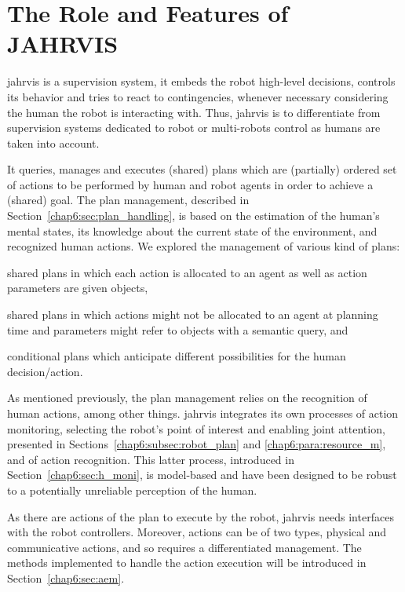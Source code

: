 \documentclass[a4paper,11pt,twoside]{StyleThese}
\begin{document}
\section{The Role and Features of JAHRVIS}\label{chap5:sec:sup_features}

\acrshort{jahrvis} is a supervision system, \ie it embeds the robot high-level decisions, controls its behavior and tries to react to contingencies, whenever necessary considering the human the robot is interacting with. Thus, \acrshort{jahrvis} is to differentiate from supervision systems dedicated to robot or multi-robots control as humans are taken into account. 

It queries, manages and executes (shared) plans which are (partially) ordered set of actions to be performed by human and robot agents in order to achieve a (shared) goal. The plan management, described in Section~\ref{chap6:sec:plan_handling}, is based on the estimation of the human's mental states, its knowledge about the current state of the environment, and recognized human actions. We explored the management of various kind of plans: 
\begin{inlineEnumerate}
	\item shared plans in which each action is allocated to an agent as well as action parameters are given objects,
	\item shared plans in which actions might not be allocated to an agent at planning time and parameters might refer to objects with a semantic query, and
	\item conditional plans which anticipate different possibilities for the human decision/action. 
\end{inlineEnumerate} 

As mentioned previously, the plan management relies on the recognition of human actions, among other things. \acrshort{jahrvis} integrates its own processes of action monitoring, \ie selecting the robot's point of interest and enabling joint attention, presented in Sections~\ref{chap6:subsec:robot_plan} and \ref{chap6:para:resource_m}, and of action recognition. This latter process, introduced in Section~\ref{chap6:sec:h_moni}, is model-based and have been designed to be robust to a potentially unreliable perception of the human.

As there are actions of the plan to execute by the robot, \acrshort{jahrvis} needs interfaces with the robot controllers. Moreover, actions can be of two types, physical and communicative actions, and so requires a differentiated management. The methods implemented to handle the action execution will be introduced in Section~\ref{chap6:sec:aem}.
\end{document}
